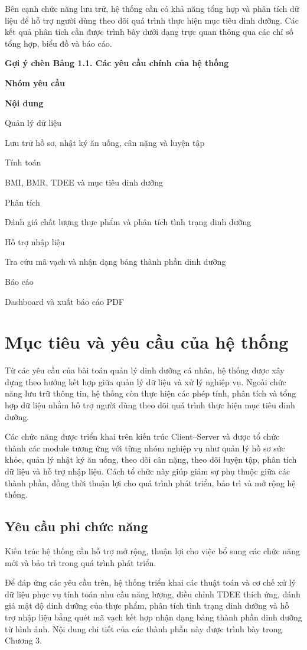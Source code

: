\documentclass[12pt, a4paper]{report}
\begin{document}
Bên cạnh chức năng lưu trữ, hệ thống cần có khả năng tổng hợp và phân tích dữ liệu để hỗ trợ người dùng theo dõi quá trình thực hiện mục tiêu dinh dưỡng. Các kết quả phân tích cần được trình bày dưới dạng trực quan thông qua các chỉ số tổng hợp, biểu đồ và báo cáo.

\textbf{Gợi ý chèn Bảng 1.1. Các yêu cầu chính của hệ thống}

\textbf{Nhóm yêu cầu}

\textbf{Nội dung}

Quản lý dữ liệu

Lưu trữ hồ sơ, nhật ký ăn uống, cân nặng và luyện tập

Tính toán

BMI, BMR, TDEE và mục tiêu dinh dưỡng

Phân tích

Đánh giá chất lượng thực phẩm và phân tích tình trạng dinh dưỡng

Hỗ trợ nhập liệu

Tra cứu mã vạch và nhận dạng bảng thành phần dinh dưỡng

Báo cáo

Dashboard và xuất báo cáo PDF

\section{Mục tiêu và yêu cầu của hệ thống}Từ các yêu cầu của bài toán quản lý dinh dưỡng cá nhân, hệ thống được xây dựng theo hướng kết hợp giữa quản lý dữ liệu và xử lý nghiệp vụ. Ngoài chức năng lưu trữ thông tin, hệ thống còn thực hiện các phép tính, phân tích và tổng hợp dữ liệu nhằm hỗ trợ người dùng theo dõi quá trình thực hiện mục tiêu dinh dưỡng.

Các chức năng được triển khai trên kiến trúc Client–Server và được tổ chức thành các module tương ứng với từng nhóm nghiệp vụ như quản lý hồ sơ sức khỏe, quản lý nhật ký ăn uống, theo dõi cân nặng, theo dõi luyện tập, phân tích dữ liệu và hỗ trợ nhập liệu. Cách tổ chức này giúp giảm sự phụ thuộc giữa các thành phần, đồng thời thuận lợi cho quá trình phát triển, bảo trì và mở rộng hệ thống.

\subsection{Yêu cầu phi chức năng}Kiến trúc hệ thống cần hỗ trợ mở rộng, thuận lợi cho việc bổ sung các chức năng mới và bảo trì trong quá trình phát triển.

Để đáp ứng các yêu cầu trên, hệ thống triển khai các thuật toán và cơ chế xử lý dữ liệu phục vụ tính toán nhu cầu năng lượng, điều chỉnh TDEE thích ứng, đánh giá mật độ dinh dưỡng của thực phẩm, phân tích tình trạng dinh dưỡng và hỗ trợ nhập liệu bằng quét mã vạch kết hợp nhận dạng bảng thành phần dinh dưỡng từ hình ảnh. Nội dung chi tiết của các thành phần này được trình bày trong Chương 3.
\end{document}
